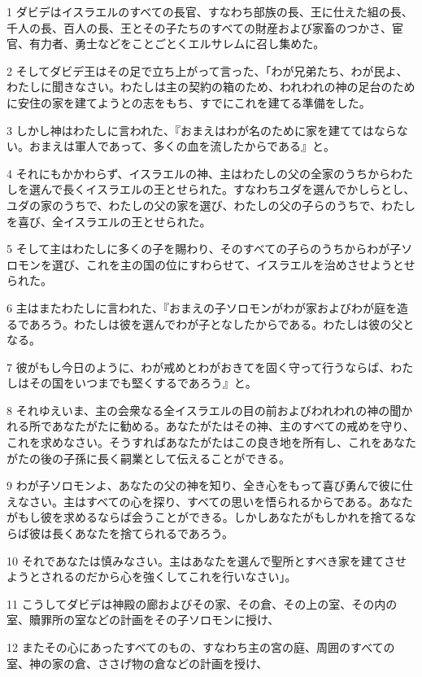 \par 1 ダビデはイスラエルのすべての長官、すなわち部族の長、王に仕えた組の長、千人の長、百人の長、王とその子たちのすべての財産および家畜のつかさ、宦官、有力者、勇士などをことごとくエルサレムに召し集めた。
\par 2 そしてダビデ王はその足で立ち上がって言った、「わが兄弟たち、わが民よ、わたしに聞きなさい。わたしは主の契約の箱のため、われわれの神の足台のために安住の家を建てようとの志をもち、すでにこれを建てる準備をした。
\par 3 しかし神はわたしに言われた、『おまえはわが名のために家を建ててはならない。おまえは軍人であって、多くの血を流したからである』と。
\par 4 それにもかかわらず、イスラエルの神、主はわたしの父の全家のうちからわたしを選んで長くイスラエルの王とせられた。すなわちユダを選んでかしらとし、ユダの家のうちで、わたしの父の家を選び、わたしの父の子らのうちで、わたしを喜び、全イスラエルの王とせられた。
\par 5 そして主はわたしに多くの子を賜わり、そのすべての子らのうちからわが子ソロモンを選び、これを主の国の位にすわらせて、イスラエルを治めさせようとせられた。
\par 6 主はまたわたしに言われた、『おまえの子ソロモンがわが家およびわが庭を造るであろう。わたしは彼を選んでわが子となしたからである。わたしは彼の父となる。
\par 7 彼がもし今日のように、わが戒めとわがおきてを固く守って行うならば、わたしはその国をいつまでも堅くするであろう』と。
\par 8 それゆえいま、主の会衆なる全イスラエルの目の前およびわれわれの神の聞かれる所であなたがたに勧める。あなたがたはその神、主のすべての戒めを守り、これを求めなさい。そうすればあなたがたはこの良き地を所有し、これをあなたがたの後の子孫に長く嗣業として伝えることができる。
\par 9 わが子ソロモンよ、あなたの父の神を知り、全き心をもって喜び勇んで彼に仕えなさい。主はすべての心を探り、すべての思いを悟られるからである。あなたがもし彼を求めるならば会うことができる。しかしあなたがもしかれを捨てるならば彼は長くあなたを捨てられるであろう。
\par 10 それであなたは慎みなさい。主はあなたを選んで聖所とすべき家を建てさせようとされるのだから心を強くしてこれを行いなさい」。
\par 11 こうしてダビデは神殿の廊およびその家、その倉、その上の室、その内の室、贖罪所の室などの計画をその子ソロモンに授け、
\par 12 またその心にあったすべてのもの、すなわち主の宮の庭、周囲のすべての室、神の家の倉、ささげ物の倉などの計画を授け、
